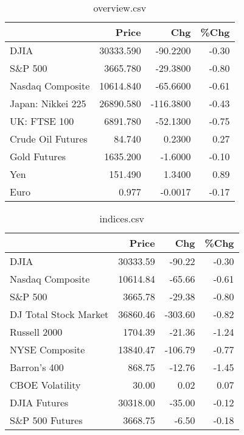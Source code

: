 \documentclass{article}%
\begin{document}
\begin{table}[htbp]%
\caption{overview.csv}%
\centering%
\begin{adjustbox}{width=1\textwidth}%
\begin{tabular}{lrrr}
\toprule
                  &     Price &       Chg &  \%Chg \\
\midrule
             DJIA & 30333.590 &  -90.2200 & -0.30 \\
          S\&P 500 &  3665.780 &  -29.3800 & -0.80 \\
 Nasdaq Composite & 10614.840 &  -65.6600 & -0.61 \\
Japan: Nikkei 225 & 26890.580 & -116.3800 & -0.43 \\
     UK: FTSE 100 &  6891.780 &  -52.1300 & -0.75 \\
Crude Oil Futures &    84.740 &    0.2300 &  0.27 \\
     Gold Futures &  1635.200 &   -1.6000 & -0.10 \\
              Yen &   151.490 &    1.3400 &  0.89 \\
             Euro &     0.977 &   -0.0017 & -0.17 \\
\bottomrule
\end{tabular}
%
\end{adjustbox}%
\end{table}

%


\begin{table}[htbp]%
\caption{indices.csv}%
\centering%
\begin{adjustbox}{width=1\textwidth}%
\begin{tabular}{lrrr}
\toprule
                      &    Price &     Chg &  \%Chg \\
\midrule
                 DJIA & 30333.59 &  -90.22 & -0.30 \\
     Nasdaq Composite & 10614.84 &  -65.66 & -0.61 \\
              S\&P 500 &  3665.78 &  -29.38 & -0.80 \\
DJ Total Stock Market & 36860.46 & -303.60 & -0.82 \\
         Russell 2000 &  1704.39 &  -21.36 & -1.24 \\
       NYSE Composite & 13840.47 & -106.79 & -0.77 \\
         Barron's 400 &   868.75 &  -12.76 & -1.45 \\
      CBOE Volatility &    30.00 &    0.02 &  0.07 \\
         DJIA Futures & 30318.00 &  -35.00 & -0.12 \\
      S\&P 500 Futures &  3668.75 &   -6.50 & -0.18 \\
\bottomrule
\end{tabular}
%
\end{adjustbox}%
\end{table}
\end{document}
